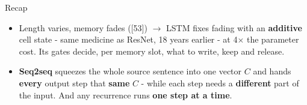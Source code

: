 \documentclass[aspectratio=169]{beamer}
\begin{document}
\begin{frame}{Recap}
  \begin{itemize}
    \item Length varies, memory fades ([53]) $\to$ LSTM fixes fading with an
      \textbf{additive} cell state - same medicine as ResNet, 18 years earlier - at
      4$\times$ the parameter cost. Its gates decide, per memory slot, what to write, keep
      and release.
    \item \textbf{Seq2seq} squeezes the whole source sentence into one vector $C$ and hands
      \textbf{every} output step that \textbf{same} $C$ - while each step needs a
      \textbf{different} part of the input. And any recurrence runs \textbf{one step at a
      time}.
  \end{itemize}
  \vskip 6pt
\end{frame}
\end{document}
